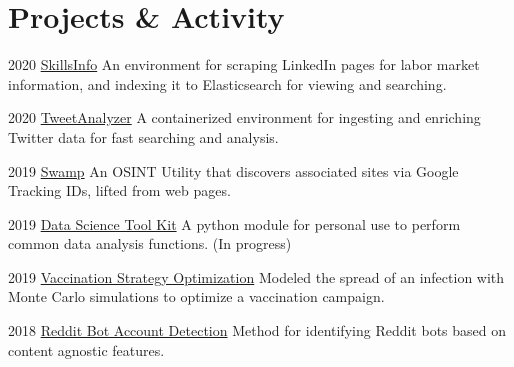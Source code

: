 \documentclass{tccv}
\begin{document}
\section{Projects \& Activity}
\begin{yearlist}
	\item  {2020}
	{\href{https://github.com/markditsworth/SkillsInfo}{SkillsInfo}}
	{An environment for scraping LinkedIn pages for labor market information, and indexing it to Elasticsearch for viewing and searching.}
	
	\item {2020}
	{\href{https://github.com/markditsworth/TweetAnalyzer}{TweetAnalyzer}}
	{A containerized environment for ingesting and enriching Twitter data for fast searching and analysis.}
	
	\item {2019}
	{\href{https://github.com/jakecreps/swamp}{Swamp}}
	{An OSINT Utility that discovers associated sites via Google Tracking IDs, lifted from web pages.}
	
	\item{2019}
	{\href{https://github.com/markditsworth/dstk}{Data Science Tool Kit}}
	{A python module for personal use to perform common data analysis functions. (In progress)}
	
	
	
	\item{2019}
	{\href{https://towardsdatascience.com/infection-modeling-part-1-87e74645568a}{Vaccination Strategy Optimization}}
	{Modeled the spread of an infection with Monte Carlo simulations to optimize a vaccination campaign.}
	
	\item{2018}
	{\href{https://chatbotslife.com/bot-detection-with-network-science-dde6525005f2}{Reddit Bot Account Detection}}
	{Method for identifying Reddit bots based on content agnostic features.}
	
	
\end{yearlist}
\end{document}
